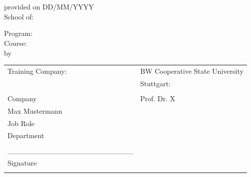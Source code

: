 



\thispagestyle{empty}

\begin{titlepage}
\vspace*{\fill}
\begin{center}
\vspace{3mm}


\textbf{ %
	\papertitle
	} \\
\vspace{1.5cm}


\papertype \\ %
\vspace{1cm}


provided on DD/MM/YYYY \\ %
\vspace{1cm}
School of: \schoolof  \\
\vspace{0.6cm}

Program: \studyprogram \\ %
\vspace{0.6cm}
Course: \studycourse \\ %
		
\vspace{2.5cm}
by \\
\paperauthor %
\vspace{3cm}

\begin{tabular}[h]{ll}

Training Company:				&	BW Cooperative State University\\
						&	Stuttgart:\\ 
 						&	\\
Company						&	Prof. Dr. X\\
Max Mustermann					&	\\
Job Role				  	&	\\
Department					&	\\
						&	\\
\_\_\_\_\_\_\_\_\_\_\_\_\_\_\_\_\_\_\_\_\_\_\_\_&	\\				
Signature					&	\\		
						&	\\

\end{tabular}
\end{center}
\vspace*{\fill}
\end{titlepage}

